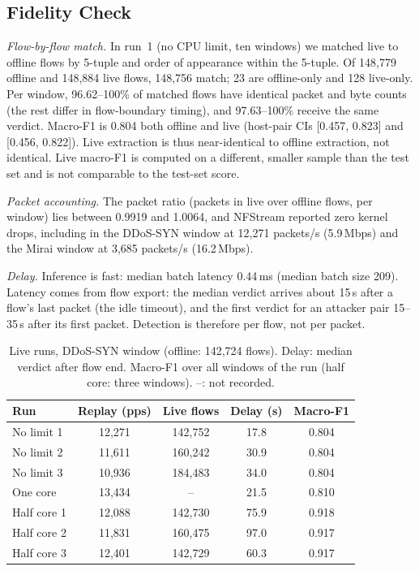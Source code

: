 \subsection{Fidelity Check}\label{sec:fidelity}

\emph{Flow-by-flow match.} In run~1 (no CPU limit, ten windows) we matched live to offline flows by 5-tuple and order of appearance within the 5-tuple. Of 148,779 offline and 148,884 live flows, 148,756 match; 23 are offline-only and 128 live-only. Per window, 96.62--100\% of matched flows have identical packet and byte counts (the rest differ in flow-boundary timing), and 97.63--100\% receive the same verdict. Macro-F1 is 0.804 both offline and live (host-pair CIs [0.457, 0.823] and [0.456, 0.822]). Live extraction is thus near-identical to offline extraction, not identical. Live macro-F1 is computed on a different, smaller sample than the test set and is not comparable to the test-set score.

\emph{Packet accounting.} The packet ratio (packets in live over offline flows, per window) lies between 0.9919 and 1.0064, and NFStream reported zero kernel drops, including in the DDoS-SYN window at 12,271 packets/s (5.9\,Mbps) and the Mirai window at 3,685 packets/s (16.2\,Mbps).

\emph{Delay.} Inference is fast: median batch latency 0.44\,ms (median batch size 209). Latency comes from flow export: the median verdict arrives about 15\,s after a flow's last packet (the idle timeout), and the first verdict for an attacker pair 15--35\,s after its first packet. Detection is therefore per flow, not per packet.

\begin{table}[t]
\centering
\caption{Live runs, DDoS-SYN window (offline: 142,724 flows). Delay: median verdict after flow end. Macro-F1 over all windows of the run (half core: three windows). --: not recorded.}
\label{tab:repeats}
\footnotesize
\setlength{\tabcolsep}{3pt}
\begin{tabular}{lcccc}
\hline
Run & Replay (pps) & Live flows & Delay (s) & Macro-F1 \\
\hline
No limit 1 & 12,271 & 142,752 & 17.8 & 0.804 \\
No limit 2 & 11,611 & 160,242 & 30.9 & 0.804 \\
No limit 3 & 10,936 & 184,483 & 34.0 & 0.804 \\
One core   & 13,434 & -- & 21.5 & 0.810 \\
Half core 1 & 12,088 & 142,730 & 75.9 & 0.918 \\
Half core 2 & 11,831 & 160,475 & 97.0 & 0.917 \\
Half core 3 & 12,401 & 142,729 & 60.3 & 0.917 \\
\hline
\end{tabular}
\end{table}

